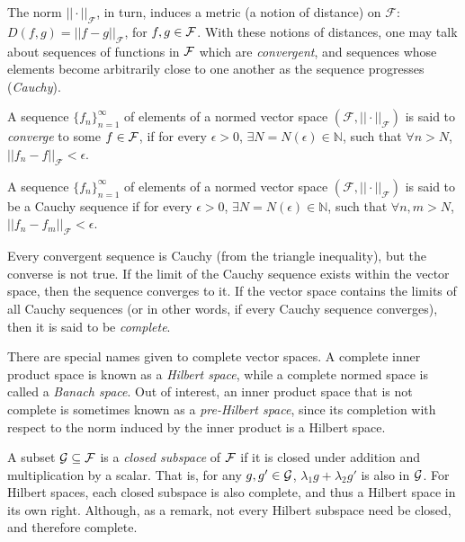The norm $||\cdot||_{\mathcal F}$, in turn, induces a metric (a notion of distance) on $\mathcal F$: $D(f,g) = ||f-g||_{\mathcal F}$, for $f,g\in{\mathcal F}$.
With these notions of distances, one may talk about sequences of functions in ${\mathcal F}$ which are \emph{convergent}, and sequences whose elements become arbitrarily close to one another as the sequence progresses (\emph{Cauchy}).

\begin{definition}
	A sequence $\{f_n\}_{n=1}^\infty$ of elements of a normed vector space $(\mathcal F, ||\cdot ||_{\mathcal F})$ is said to \emph{converge} to some $f\in{\mathcal F}$, if for every $\epsilon > 0$, $\exists N=N(\epsilon) \in \mathbb N$, such that $\forall n > N$, $||f_n - f||_{\mathcal F} < \epsilon$.
\end{definition}

\begin{definition}
	A sequence $\{f_n\}_{n=1}^\infty$ of elements of a normed vector space $(\mathcal F, ||\cdot ||_{\mathcal F})$ is said to be a Cauchy sequence if for every $\epsilon > 0$, $\exists N=N(\epsilon) \in \mathbb N$, such that $\forall n,m > N$, $||f_n - f_m||_{\mathcal F} < \epsilon$.
\end{definition}

Every convergent sequence is Cauchy (from the triangle inequality), but the converse is not true.
If the limit of the Cauchy sequence exists within the vector space, then the sequence converges to it.
If the vector space contains the limits of all Cauchy sequences (or in other words, if every Cauchy sequence converges), then it is said to be \emph{complete}.

There are special names given to complete vector spaces.
A complete inner product space is known as a \emph{Hilbert space}, while a complete normed space is called a \emph{Banach space}.
Out of interest, an inner product space that is not complete is sometimes known as a \emph{pre-Hilbert space}, since its completion with respect to the norm induced by the inner product is a Hilbert space.

A subset ${\mathcal G}\subseteq{\mathcal F}$ is a \emph{closed subspace} of ${\mathcal F}$ if it is closed under addition and multiplication by a scalar.
That is, for any $g,g'\in{\mathcal G}$, $\lambda_1g + \lambda_2g'$ is also in ${\mathcal G}$.
For Hilbert spaces, each closed subspace is also complete, and thus a Hilbert space in its own right.
Although, as a remark, not every Hilbert subspace need be closed, and therefore complete. 

